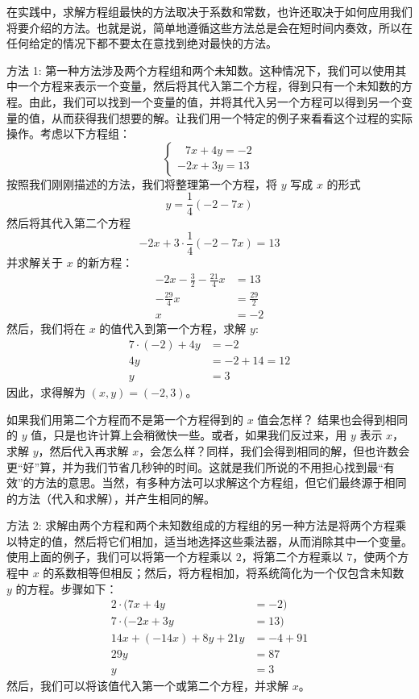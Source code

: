 在实践中，求解方程组最快的方法取决于系数和常数，也许还取决于如何应用我们将要介绍的方法。也就是说，简单地遵循这些方法总是会在短时间内奏效，所以在任何给定的情况下都不要太在意找到绝对最快的方法。

\begin{method}{方法 1: }
    第一种方法涉及两个方程组和两个未知数。这种情况下，我们可以使用其中一个方程来表示一个变量，然后将其代入第二个方程，得到只有一个未知数的方程。由此，我们可以找到一个变量的值，并将其代入另一个方程可以得到另一个变量的值，从而获得我们想要的解。让我们用一个特定的例子来看看这个过程的实际操作。考虑以下方程组：
    $$
    \begin{cases}
        \enspace\: 7x+4y =-2 \\
        -2x+3y =13
    \end{cases}
    $$
    按照我们刚刚描述的方法，我们将整理第一个方程，将 $y$ 写成 $x$ 的形式
    \[y = \frac{1}{4}(-2-7x)\]
    然后将其代入第二个方程
    \[-2x + 3 \cdot \frac{1}{4}(-2 - 7x) = 13\]
    并求解关于 $x$ 的新方程：
    \begin{align*}
        -2x-\frac{3}{2}-\frac{21}{4}x &= 13 \\
        -\frac{29}{4}x &= \frac{29}{2} \\
        x &= -2
    \end{align*}
    然后，我们将在 $x$ 的值代入到第一个方程，求解 $y$: 
    \begin{align*}
        7 \cdot (-2) + 4y &= -2 \\
        4y &= -2+14 = 12 \\
        y &= 3
    \end{align*}
    因此，求得解为 $(x, y) = (-2, 3)$。
\end{method}

如果我们用第二个方程而不是第一个方程得到的 $x$ 值会怎样？ 结果也会得到相同的 $y$ 值，只是也许计算上会稍微快一些。或者，如果我们反过来，用 $y$ 表示 $x$，求解 $y$，然后代入再求解 $x$，会怎么样？同样，我们会得到相同的解，但也许数会更“好”算，并为我们节省几秒钟的时间。这就是我们所说的不用担心找到最“有效”的方法的意思。当然，有多种方法可以求解这个方程组，但它们最终源于相同的方法（代入和求解），并产生相同的解。

\begin{method}{方法 2: }
    求解由两个方程和两个未知数组成的方程组的另一种方法是将两个方程乘以特定的值，然后将它们相加，适当地选择这些乘法器，从而消除其中一个变量。使用上面的例子，我们可以将第一个方程乘以 $2$，将第二个方程乘以 $7$，使两个方程中 $x$ 的系数相等但相反；然后，将方程相加，将系统简化为一个仅包含未知数 $y$ 的方程。步骤如下：
    \begin{align*}
        2 \cdot (7x+4y &= -2) \\ 
        7 \cdot (-2x+3y &=13) \\
        14x + (-14x) + 8y + 21y &= -4 + 91 \\
        29y &= 87 \\
        y &= 3
    \end{align*}
    然后，我们可以将该值代入第一个或第二个方程，并求解 $x$。
\end{method}


